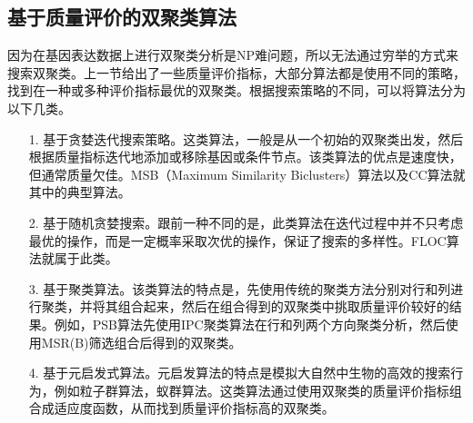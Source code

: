   \subsection{基于质量评价的双聚类算法}
  因为在基因表达数据上进行双聚类分析是NP难问题，所以无法通过穷举的方式来搜索双聚类。上一节给出了一些质量评价指标，大部分算法都是使用不同的策略，找到在一种或多种评价指标最优的双聚类。根据搜索策略的不同，可以将算法分为以下几类。
  \begin{enumerate}
    \item[1.] 基于贪婪迭代搜索策略。这类算法，一般是从一个初始的双聚类出发，然后根据质量指标迭代地添加或移除基因或条件节点。该类算法的优点是速度快，但通常质量欠佳。MSB（Maximum Similarity Biclusters）算法以及CC算法就其中的典型算法。

    \item[2.] 基于随机贪婪搜索。跟前一种不同的是，此类算法在迭代过程中并不只考虑最优的操作，而是一定概率采取次优的操作，保证了搜索的多样性。FLOC算法就属于此类。
    
    \item[3.] 基于聚类算法。该类算法的特点是，先使用传统的聚类方法分别对行和列进行聚类，并将其组合起来，然后在组合得到的双聚类中挑取质量评价较好的结果。例如，PSB算法先使用IPC聚类算法在行和列两个方向聚类分析，然后使用MSR(B)筛选组合后得到的双聚类。
    
    \item[4.] 基于元启发式算法。元启发算法的特点是模拟大自然中生物的高效的搜索行为，例如粒子群算法，蚁群算法。这类算法通过使用双聚类的质量评价指标组合成适应度函数，从而找到质量评价指标高的双聚类。
  \end{enumerate}

